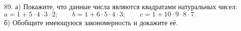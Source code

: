 89. а) Покажите, что данные числа являются квадратами натуральных чисел:\\
$a=1+5\cdot4\cdot3\cdot2;\qquad b=1+6\cdot5\cdot4\cdot3;\qquad c=1+10\cdot9\cdot8\cdot7.$\\
б) Обобщите имеющуюся закономерность и докажите её.\\
